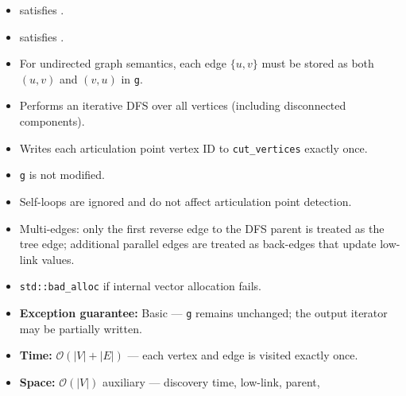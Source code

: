 \begin{itemdescr}
      \pnum\mandates
            \begin{itemize}
                  \item {} satisfies .
                  \item {} satisfies .
            \end{itemize}
      \pnum\preconditions
            \begin{itemize}
                  \item For undirected graph semantics, each edge $\{u,v\}$ must be stored as
                        both $(u,v)$ and $(v,u)$ in \lstinline{g}.
            \end{itemize}
      \pnum\effects
            \begin{itemize}
                  \item Performs an iterative DFS over all vertices (including disconnected components).
                  \item Writes each articulation point vertex ID to \lstinline{cut_vertices} exactly once.
                  \item \lstinline{g} is not modified.
                  \item Self-loops are ignored and do not affect articulation point detection.
                  \item Multi-edges: only the first reverse edge to the DFS parent is treated as the
                        tree edge; additional parallel edges are treated as back-edges that update
                        low-link values.
            \end{itemize}
      \pnum\throws
            \begin{itemize}
                  \item \lstinline{std::bad_alloc} if internal vector allocation fails.
                  \item \textbf{Exception guarantee:} Basic --- \lstinline{g} remains unchanged;
                        the output iterator may be partially written.
            \end{itemize}
      \pnum\complexity
            \begin{itemize}
                  \item \textbf{Time:} $\mathcal{O}(|V|+|E|)$ --- each vertex and edge is visited exactly once.
                  \item \textbf{Space:} $\mathcal{O}(|V|)$ auxiliary --- discovery time, low-link, parent,

\end{itemize}
\end{itemdescr}
